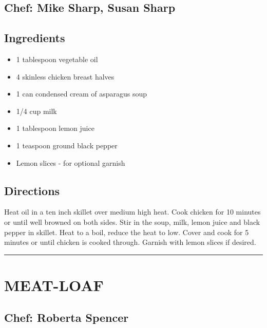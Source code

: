\documentclass[
]{book}
\providecommand{\tightlist}{%
  \setlength{\itemsep}{0pt}\setlength{\parskip}{0pt}}
\begin{document}
\hypertarget{chef-mike-sharp-susan-sharp}{%
\subsection*{Chef: Mike Sharp, Susan Sharp}\label{chef-mike-sharp-susan-sharp}}


\hypertarget{ingredients-60}{%
\subsection*{Ingredients}\label{ingredients-60}}


\begin{itemize}
\tightlist
\item
  1 tablespoon vegetable oil
\item
  4 skinless chicken breast halves
\item
  1 can condensed cream of asparagus soup
\item
  1/4 cup milk
\item
  1 tablespoon lemon juice
\item
  1 teaspoon ground black pepper
\item
  Lemon slices - for optional garnish
\end{itemize}

\hypertarget{directions-60}{%
\subsection*{Directions}\label{directions-60}}


Heat oil in a ten inch skillet over medium high heat. Cook chicken for 10 minutes or until well browned on both sides. Stir in the soup, milk, lemon juice and black pepper in skillet. Heat to a boil, reduce the heat to low. Cover and cook for 5 minutes or until chicken is cooked through. Garnish with lemon slices if desired.

\begin{center}\rule{0.5\linewidth}{0.5pt}\end{center}

\hypertarget{meat-loaf}{%
\section*{MEAT-LOAF}\label{meat-loaf}}


\hypertarget{chef-roberta-spencer-21}{%
\subsection*{Chef: Roberta Spencer}\label{chef-roberta-spencer-21}}
\end{document}
